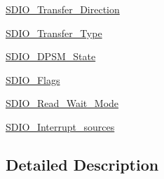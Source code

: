 \begin{DoxyCompactItemize}
\hyperlink{group___s_d_i_o___transfer___direction}{S\-D\-I\-O\-\_\-\-Transfer\-\_\-\-Direction}
\item 
\hyperlink{group___s_d_i_o___transfer___type}{S\-D\-I\-O\-\_\-\-Transfer\-\_\-\-Type}
\item 
\hyperlink{group___s_d_i_o___d_p_s_m___state}{S\-D\-I\-O\-\_\-\-D\-P\-S\-M\-\_\-\-State}
\item 
\hyperlink{group___s_d_i_o___flags}{S\-D\-I\-O\-\_\-\-Flags}
\item 
\hyperlink{group___s_d_i_o___read___wait___mode}{S\-D\-I\-O\-\_\-\-Read\-\_\-\-Wait\-\_\-\-Mode}
\item 
\hyperlink{group___s_d_i_o___interrupt__sources}{S\-D\-I\-O\-\_\-\-Interrupt\-\_\-sources}
\end{DoxyCompactItemize}


\subsection{Detailed Description}
